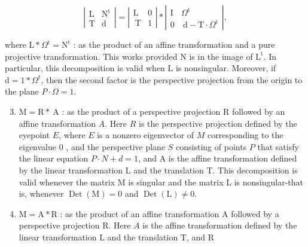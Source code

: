 $$
\left|\begin{array}{cc}
\mathrm{L} & \mathrm{N}^{\mathrm{t}} \\
\mathrm{T} & \mathrm{d}
\end{array}\right|=\left|\begin{array}{ll}
\mathrm{L} & 0 \\
\mathrm{~T} & 1
\end{array}\right| *\left|\begin{array}{cc}
\mathrm{I} & \Omega^{\mathrm{t}} \\
0 & \mathrm{~d}-\mathrm{T} \cdot \Omega^{\mathrm{t}}
\end{array}\right|,
$$

where $\mathrm{L} * \Omega^{\mathrm{t}}=\mathrm{N}^{\mathrm{t}}$ : as the product of an affine transformation and a pure projective transformation. This works provided $\mathrm{N}$ is in the image of $\mathrm{L}^{\mathrm{t}}$. In particular, this decomposition is valid when $\mathrm{L}$ is nonsingular. Moreover, if $\mathrm{d}=1 * \Omega^{\mathrm{t}}$, then the second factor is the perspective projection from the origin to the plane $P \cdot \Omega=1$.

\begin{enumerate}
  \setcounter{enumi}{2}
  \item $\mathrm{M}=\mathrm{R} * \mathrm{~A}$ : as the product of a perspective projection $\mathrm{R}$ followed by an affine transformation $A$. Here $R$ is the perspective projection defined by the eyepoint $E$, where $E$ is a nonzero eigenvector of $M$ corresponding to the eigenvalue 0 , and the perspective plane $S$ consisting of points $P$ that satisfy the linear equation $P \cdot N+d=1$, and $\mathrm{A}$ is the affine transformation defined by the linear transformation $\mathrm{L}$ and the translation T. This decomposition is valid whenever the matrix $\mathrm{M}$ is singular and the matrix L is nonsingular-that is, whenever $\operatorname{Det}(\mathrm{M})=0$ and $\operatorname{Det}(\mathrm{L}) \neq 0$.

  \item $\mathrm{M}=\mathrm{A} * \mathrm{R}$ : as the product of an affine transformation $\mathrm{A}$ followed by a perspective projection R. Here $A$ is the affine transformation defined by the linear transformation $\mathrm{L}$ and the translation $\mathrm{T}$, and $\mathrm{R}$

\end{enumerate}


